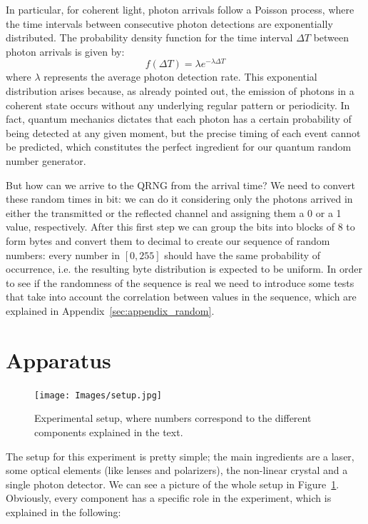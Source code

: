 \documentclass[prl,twocolumn]{revtex4-1}
\begin{document}
In particular, for coherent light, photon arrivals follow a Poisson process, where the time intervals between consecutive photon detections are exponentially distributed. The probability density function for the time interval $\Delta T$ between photon arrivals is given by:
%
\begin{equation}
    \label{eq:geometric_distribution}
    f(\Delta T) = \lambda e^{-\lambda \Delta T}
\end{equation}
%
where $\lambda$ represents the average photon detection rate. This exponential distribution arises because, as already pointed out, the emission of photons in a coherent state occurs without any underlying regular pattern or periodicity. In fact, quantum mechanics dictates that each photon has a certain probability of being detected at any given moment, but the precise timing of each event cannot be predicted, which constitutes the perfect ingredient for our quantum random number generator.

But how can we arrive to the QRNG from the arrival time? We need to convert these random times in bit: we can do it considering only the photons arrived in either the transmitted or the reflected channel and assigning them a 0 or a 1 value, respectively. After this first step we can group the bits into blocks of 8 to form bytes and convert them to decimal to create our sequence of random numbers: every number in $[0, 255]$ should have the same probability of occurrence, i.e. the resulting byte distribution is expected to be uniform. In order to see if the randomness of the sequence is real we need to introduce some tests that take into account the correlation between values in the sequence, which are explained in Appendix~\ref{sec:appendix_random}.


\section{Apparatus}
\begin{figure}[!b]
    \centering
    \texttt{[image: Images/setup.jpg]}
    \caption{Experimental setup, where numbers correspond to the different components explained in the text.}
    \label{fig:setup}
\end{figure}

The setup for this experiment is pretty simple; the main ingredients are a laser, some optical elements (like lenses and polarizers), the non-linear crystal and a single photon detector. We can see a picture of the whole setup in Figure~\ref{fig:setup}. Obviously, every component has a specific role in the experiment, which is explained in the following:
\end{document}
